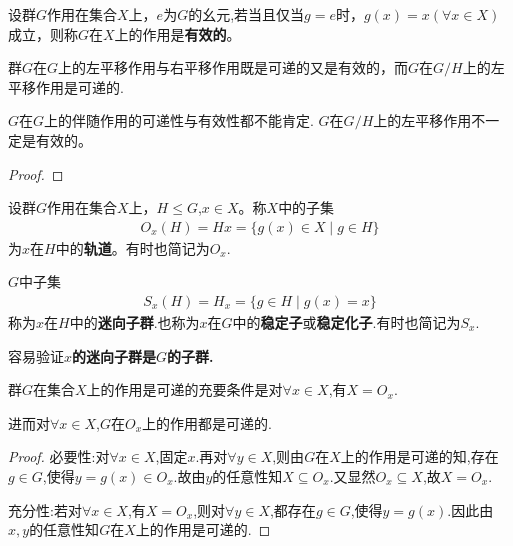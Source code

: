 \documentclass[../../main.tex]{subfiles}%
\begin{document}
\begin{definition}
设群$G$作用在集合$X$上，$e$为$G$的幺元,若当且仅当$g = e$时，$g(x) = x(\forall x \in X)$成立，则称$G$在$X$上的作用是\textbf{有效的}。
\end{definition}

\begin{proposition}
群$G$在$G$上的左平移作用与右平移作用既是可递的又是有效的，而$G$在$G/H$上的左平移作用是可递的.
\end{proposition}
\begin{remark}
$G$在$G$上的伴随作用的可递性与有效性都不能肯定.
$G$在$G/H$上的左平移作用不一定是有效的。
\end{remark}
\begin{proof}

\end{proof}

\begin{definition}
设群$G$作用在集合$X$上，$H\leqslant G$,$x \in X$。称$X$中的子集
\begin{align*}
O_x(H)=Hx = \{g(x)\in X \mid g \in H\}
\end{align*}
为$x$在$H$中的\textbf{轨道}。有时也简记为$O_x$.

$G$中子集
\begin{align*}
S_x(H)=H_x= \{g \in H\mid  g(x) = x\}
\end{align*}
称为$x$在$H$中的\textbf{迷向子群}.也称为$x$在$G$中的\textbf{稳定子}或\textbf{稳定化子}.有时也简记为$S_x$.
\end{definition}
\begin{remark}
容易验证\textbf{$x$的迷向子群是$G$的子群.}
\end{remark}

\begin{proposition}\label{proposition:可递的群作用X等于其轨道}
群$G$在集合$X$上的作用是可递的充要条件是对$\forall x \in X$,有$X=O_x$.

进而对$\forall x\in X$,$G$在$O_x$上的作用都是可递的.
\end{proposition}
\begin{proof}

{\heiti 必要性:}对$\forall x\in X$,固定$x$.再对$\forall y\in X$,则由$G$在$X$上的作用是可递的知,存在$g\in G$,使得$y=g(x)\in O_x$.故由$y$的任意性知$X\subseteq O_x$.又显然$O_x\subseteq X$,故$X=O_x$.

{\heiti 充分性:}若对$\forall x\in X$,有$X=O_x$,则对$\forall y\in X$,都存在$g\in G$,使得$y=g(x)$.因此由$x,y$的任意性知$G$在$X$上的作用是可递的.
\end{proof}
\end{document}
